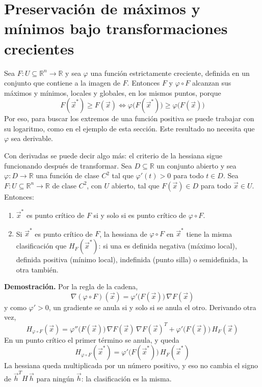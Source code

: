 \documentclass{article}
\newcommand{\R}{\ensuremath{\mathbb{R}}}
\newcommand{\vect}[1]{\vec{#1}}
\begin{document}
\medskip




\section*{Preservación de máximos y mínimos bajo transformaciones crecientes}

Sea \(F\colon U\subseteq\R^n\to\R\) y sea \(\varphi\) una función estrictamente creciente, definida en un conjunto que contiene a la imagen de \(F\). {\color{teal}Entonces \(F\) y \(\varphi\circ F\) alcanzan sus máximos y mínimos, locales y globales, en los mismos puntos}, porque
\[
F(\vect{x}^*)\ge F(\vect{x})\iff\varphi\bigl(F(\vect{x}^*)\bigr)\ge\varphi\bigl(F(\vect{x})\bigr)
\]
Por eso, para buscar los extremos de una función positiva se puede trabajar con su logaritmo, como en el ejemplo de esta sección. Este resultado no necesita que \(\varphi\) sea derivable.

Con derivadas se puede decir algo más: el criterio de la hessiana sigue funcionando después de transformar. Sea \(D\subseteq\R\) un conjunto abierto y sea \(\varphi\colon D\to\R\) una función de clase \(C^2\) tal que \(\varphi'(t)>0\) para todo \(t\in D\). Sea \(F\colon U\subseteq\R^n\to\R\) de clase \(C^2\), con \(U\) abierto, tal que \(F(\vect{x})\in D\) para todo \(\vect{x}\in U\).
Entonces:

\begin{enumerate}
  \item \(\vect{x}^*\) es punto crítico de \(F\) si y solo si es punto crítico de \(\varphi\circ F\).
  \item Si \(\vect{x}^*\) es punto crítico de \(F\), la hessiana de \(\varphi\circ F\) en \(\vect{x}^*\) tiene la misma clasificación que \(H_F(\vect{x}^*)\): si una es definida negativa (máximo local), definida positiva (mínimo local), indefinida (punto silla) o semidefinida, la otra también.
\end{enumerate}

\noindent\textbf{Demostración.} Por la regla de la cadena,
\[
\nabla(\varphi\circ F)(\vect{x})=\varphi'\bigl(F(\vect{x})\bigr)\,\nabla F(\vect{x})
\]
y como \(\varphi'>0\), un gradiente se anula si y solo si se anula el otro. Derivando otra vez,
\[
H_{\varphi\circ F}(\vect{x})=\varphi''\bigl(F(\vect{x})\bigr)\,\nabla F(\vect{x})\,\nabla F(\vect{x})^{T}+\varphi'\bigl(F(\vect{x})\bigr)\,H_F(\vect{x})
\]
En un punto crítico el primer término se anula, y queda
\[
H_{\varphi\circ F}(\vect{x}^*)=\varphi'\bigl(F(\vect{x}^*)\bigr)\,H_F(\vect{x}^*)
\]
La hessiana queda multiplicada por un número positivo, y eso no cambia el signo de \(\vect{h}^{T}H\,\vect{h}\) para ningún \(\vect{h}\): la clasificación es la misma.
\end{document}
